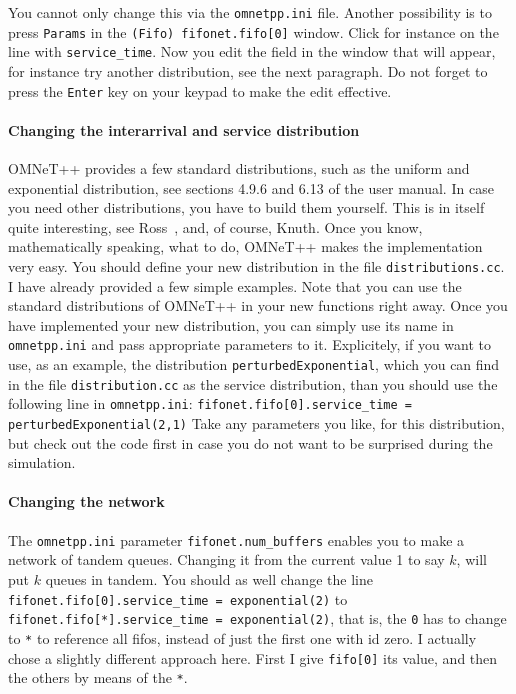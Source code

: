 \documentclass[a4paper]{article}
\begin{document}
You cannot only change this via the \texttt{omnetpp.ini} file. Another
possibility is to press \texttt{Params} in the \texttt{(Fifo)
  fifonet.fifo[0]} window. Click for instance on the  line with
\texttt{service\_time}. Now you edit the field in the window that will
appear, for instance try another distribution, see the next paragraph.
Do not forget to press the \texttt{Enter} key on your keypad to make
the edit effective.

\paragraph{Changing the interarrival and service distribution}
\label{sec:chang-inter-serv-1}
OMNeT++ provides a few standard distributions, such as the uniform and
exponential distribution, see sections 4.9.6 and 6.13 of the user
manual. In case you need other distributions, you have to build them
yourself. This is in itself quite interesting, see Ross~\cite{Ross93},
and, of course, Knuth\cite{Knuth97}. Once you know, mathematically
speaking, what to do, OMNeT++ makes the implementation very easy.  You
should define your new distribution in the file
\texttt{distributions.cc}. I have already provided a few simple
examples.  Note that you can use the standard distributions of OMNeT++
in your new functions right away. Once you have implemented your new
distribution, you can simply use its name in \texttt{omnetpp.ini} and
pass appropriate parameters to it. Explicitely, if you want to use, as
an example, the distribution \texttt{perturbedExponential}, which you
can find in the file \texttt{distribution.cc} as
the service distribution, than you should use the following line in
\texttt{omnetpp.ini}:
\texttt{fifonet.fifo[0].service\_time = perturbedExponential(2,1)}
Take any parameters you like, for this distribution, but check out
the code first in case you do not want to be surprised during the
simulation.

\paragraph{Changing the network}
\label{sec:changing-network}
The \texttt{omnetpp.ini} parameter \texttt{fifonet.num\_buffers}
enables you to make a network of tandem queues. Changing it from the
current value 1 to say $k$, will put $k$ queues in tandem. You should
as well change the line
 \texttt{fifonet.fifo[0].service\_time = exponential(2)}  to
\texttt{fifonet.fifo[*].service\_time = exponential(2)}, that is, the
\texttt{0} has to  change to \texttt{*} to reference all fifos, instead of
just the first one with id zero. I actually chose a slightly different
approach here. First I give \texttt{fifo[0]} its value, and then the
others by means of the \texttt{*}.
\end{document}
